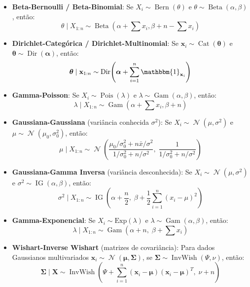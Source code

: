 \documentclass{tufte-handout}
\DeclareMathOperator{\Bern}{Bern}
\DeclareMathOperator{\Pois}{Pois}
\DeclareMathOperator{\Beta}{Beta}
\DeclareMathOperator{\Dir}{Dir}
\DeclareMathOperator{\Cat}{Cat}
\DeclareMathOperator{\Gam}{Gam}
\DeclareMathOperator{\N}{\mathcal{N}}
\DeclareMathOperator{\IG}{IG}
\DeclareMathOperator{\InvWish}{InvWish}
\begin{document}
\begin{itemize}
    \item \textbf{Beta-Bernoulli / Beta-Binomial}: Se $X_i \sim \Bern(\theta)$ e $\theta \sim \Beta(\alpha, \beta)$, então:
    \[
    \theta \mid X_{1:n} \sim \Beta\!\left(\alpha + \sum x_i, \beta + n - \sum x_i\right)
    \]
    
    \item \textbf{Dirichlet-Categórica / Dirichlet-Multinomial}: Se $\mathbf{x}_i \sim \Cat(\boldsymbol{\theta})$ e $\boldsymbol{\theta} \sim \Dir(\boldsymbol{\alpha})$, então:
    \[
    \boldsymbol{\theta} \mid \mathbf{x}_{1:n} \sim \Dir\!\left(\boldsymbol{\alpha} + \sum_{i=1}^n \mathbbm{1}_{\mathbf{x}_i}\right)
    \]
    
    \item \textbf{Gamma-Poisson}: Se $X_i \sim \Pois(\lambda)$ e $\lambda \sim \Gam(\alpha, \beta)$, então:
    \[
    \lambda \mid X_{1:n} \sim \Gam\!\left(\alpha + \sum x_i, \beta + n\right)
    \]
    
    \item \textbf{Gaussiana-Gaussiana} (variância conhecida $\sigma^2$): Se $X_i \sim \N(\mu, \sigma^2)$ e $\mu \sim \N(\mu_0, \sigma_0^2)$, então:
    \[
    \mu \mid X_{1:n} \sim \N\!\left(\frac{\mu_0/\sigma_0^2 + n\bar{x}/\sigma^2}{1/\sigma_0^2 + n/\sigma^2},\; \frac{1}{1/\sigma_0^2 + n/\sigma^2}\right)
    \]
    
    \item \textbf{Gaussiana-Gamma Inversa} (variância desconhecida): Se $X_i \sim \N(\mu, \sigma^2)$ e $\sigma^2 \sim \IG(\alpha, \beta)$, então:
    \[
    \sigma^2 \mid X_{1:n} \sim \IG\!\left(\alpha + \frac{n}{2},\; \beta + \frac{1}{2}\sum_{i=1}^n (x_i - \mu)^2\right)
    \]
    
    \item \textbf{Gamma-Exponencial}: Se $X_i \sim \text{Exp}(\lambda)$ e $\lambda \sim \Gam(\alpha, \beta)$, então:
    \[
    \lambda \mid X_{1:n} \sim \Gam\!\left(\alpha + n,\; \beta + \sum x_i\right)
    \]
    
    \item \textbf{Wishart-Inverse Wishart} (matrizes de covariância): Para dados Gaussianos multivariados $\mathbf{x}_i \sim \N(\boldsymbol{\mu}, \boldsymbol{\Sigma})$, se $\boldsymbol{\Sigma} \sim \InvWish(\Psi, \nu)$, então:
    \[
    \boldsymbol{\Sigma} \mid \mathbf{X} \sim \InvWish\!\left(\Psi + \sum_{i=1}^n (\mathbf{x}_i - \boldsymbol{\mu})(\mathbf{x}_i - \boldsymbol{\mu})^T,\; \nu + n\right)
    \]
\end{itemize}
\end{document}
